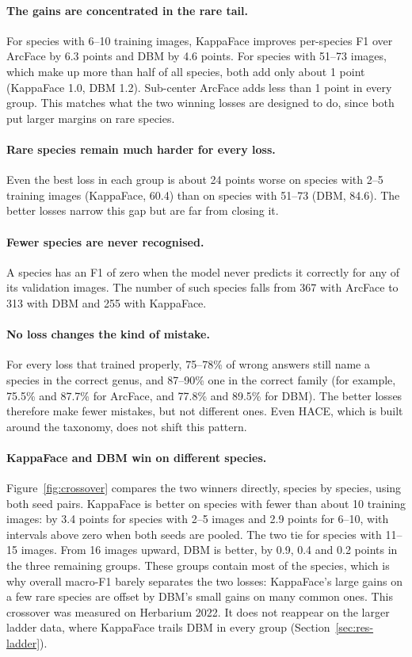 \documentclass[11pt]{article}
\begin{document}
\paragraph{The gains are concentrated in the rare tail.} For species with 6--10
training images, KappaFace improves per-species F1 over ArcFace by 6.3 points and DBM by
4.6 points. For species with 51--73 images, which make up more than half of all species,
both add only about 1 point (KappaFace 1.0, DBM 1.2). Sub-center ArcFace adds less than
1 point in every group. This matches what the two winning losses are designed to do,
since both put larger margins on rare species.

\paragraph{Rare species remain much harder for every loss.} Even the best loss in each
group is about 24 points worse on species with 2--5 training images (KappaFace, 60.4)
than on species with 51--73 (DBM, 84.6). The better losses narrow this gap but are far
from closing it.

\paragraph{Fewer species are never recognised.} A species has an F1 of zero when the
model never predicts it correctly for any of its validation images. The number of such
species falls from 367 with ArcFace to 313 with DBM and 255 with KappaFace.

\paragraph{No loss changes the kind of mistake.} For every loss that trained properly,
75--78\% of wrong answers still name a species in the correct genus, and 87--90\% one in
the correct family (for example, 75.5\% and 87.7\% for ArcFace, and 77.8\% and 89.5\% for
DBM). The better losses therefore make fewer mistakes, but not different ones. Even
HACE, which is built around the taxonomy, does not shift this pattern.

\paragraph{KappaFace and DBM win on different species.} Figure~\ref{fig:crossover}
compares the two winners directly, species by species, using both seed pairs. KappaFace
is better on species with fewer than about 10 training images: by 3.4 points for
species with 2--5 images and 2.9 points for 6--10, with intervals above zero when both
seeds are pooled. The two tie for species with 11--15 images. From 16 images upward,
DBM is better, by 0.9, 0.4 and 0.2 points in the three remaining groups. These groups
contain most of the species, which is why overall macro-F1 barely separates the two
losses: KappaFace's large gains on a few rare species are offset by DBM's small gains on
many common ones. This crossover was measured on Herbarium 2022. It does not reappear on
the larger ladder data, where KappaFace trails DBM in every group
(Section~\ref{sec:res-ladder}).
\end{document}
